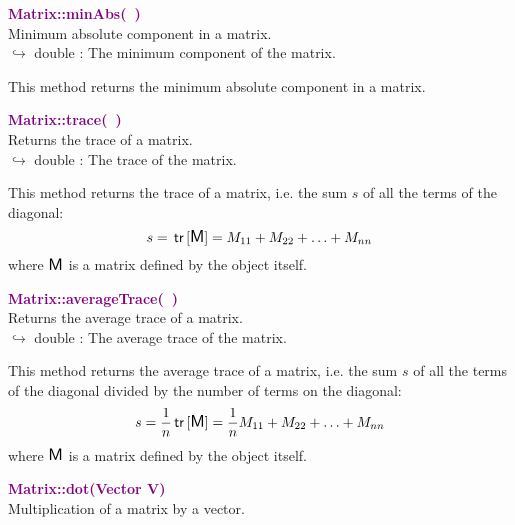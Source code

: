 \textcolor{purple}{\textbf{Matrix::minAbs(~)}}\label{Matrix::minAbs()}\\
Minimum absolute component in a matrix.\\ \hspace*{10mm}$\hookrightarrow$ double : The minimum component of the matrix.

This method returns the minimum absolute component in a matrix.

\textcolor{purple}{\textbf{Matrix::trace(~)}}\label{Matrix::trace()}\\
Returns the trace of a matrix.\\ \hspace*{10mm}$\hookrightarrow$ double : The trace of the matrix.

This method returns the trace of a matrix, i.e. the sum $s$ of all the terms of the diagonal:
\begin{equation*}
s = \mbox{\ensuremath{\mathsf{\,tr\,}}}[\mbox{\large\ensuremath{\mathsf{M}}}] = M_{11}+M_{22}+\hdots+M_{nn}
\end{equation*}
where $\mbox{\large\ensuremath{\mathsf{M}}}$ is a matrix defined by the object itself.

\textcolor{purple}{\textbf{Matrix::averageTrace(~)}}\label{Matrix::averageTrace()}\\
Returns the average trace of a matrix.\\ \hspace*{10mm}$\hookrightarrow$ double : The average trace of the matrix.

This method returns the average trace of a matrix, i.e. the sum $s$ of all the terms of the diagonal divided by the number of terms on the diagonal:
\begin{equation*}
s = \frac{1}{n} \mbox{\ensuremath{\mathsf{\,tr\,}}}[\mbox{\large\ensuremath{\mathsf{M}}}] = \frac{1}{n} M_{11}+M_{22}+\hdots+M_{nn}
\end{equation*}
where $\mbox{\large\ensuremath{\mathsf{M}}}$ is a matrix defined by the object itself.

\textcolor{purple}{\textbf{Matrix::dot(Vector V)}}\label{Matrix::dot(Vector V)}\\
Multiplication of a matrix by a vector.

